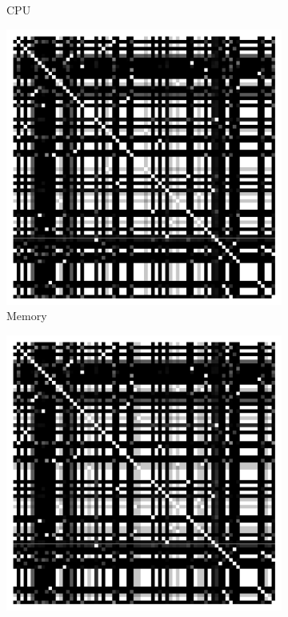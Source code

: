 \begin{figure}[t]
\begin{subfigure}{0.19\textwidth}
                \caption{CPU}
        \end{subfigure}%
        \begin{subfigure}{0.19\textwidth}
                \includegraphics[width=\linewidth]{Figures/hadoop-mem-commitX.pdf}
                \caption{Memory}
        \end{subfigure}%
        \begin{subfigure}{0.19\textwidth}
                \includegraphics[width=\linewidth]{Figures/hadoop-ioread-commitX.pdf}

\end{subfigure}
\end{figure}
